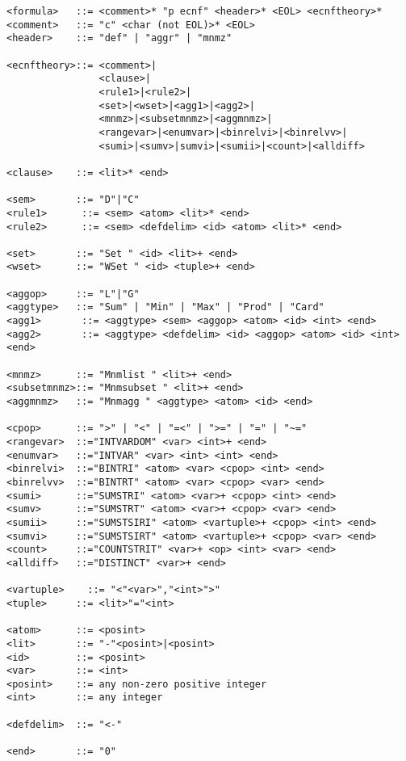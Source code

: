 \documentclass{article}
\begin{document}
\begin{verbatim}
<formula>   ::= <comment>* "p ecnf" <header>* <EOL> <ecnftheory>*
<comment>   ::= "c" <char (not EOL)>* <EOL>
<header>    ::= "def" | "aggr" | "mnmz"

<ecnftheory>::= <comment>|
                <clause>|
                <rule1>|<rule2>|
                <set>|<wset>|<agg1>|<agg2>|
                <mnmz>|<subsetmnmz>|<aggmnmz>|
                <rangevar>|<enumvar>|<binrelvi>|<binrelvv>|
                <sumi>|<sumv>|sumvi>|<sumii>|<count>|<alldiff>

<clause>    ::= <lit>* <end>

<sem>       ::= "D"|"C"
<rule1>      ::= <sem> <atom> <lit>* <end>
<rule2>      ::= <sem> <defdelim> <id> <atom> <lit>* <end>

<set>       ::= "Set " <id> <lit>+ <end>
<wset>      ::= "WSet " <id> <tuple>+ <end>

<aggop>     ::= "L"|"G"
<aggtype>   ::= "Sum" | "Min" | "Max" | "Prod" | "Card"
<agg1>       ::= <aggtype> <sem> <aggop> <atom> <id> <int> <end>
<agg2>       ::= <aggtype> <defdelim> <id> <aggop> <atom> <id> <int> <end>

<mnmz>      ::= "Mnmlist " <lit>+ <end>
<subsetmnmz>::= "Mnmsubset " <lit>+ <end>
<aggmnmz>   ::= "Mnmagg " <aggtype> <atom> <id> <end>

<cpop>      ::= ">" | "<" | "=<" | ">=" | "=" | "~="
<rangevar>  ::="INTVARDOM" <var> <int>+ <end>
<enumvar>   ::="INTVAR" <var> <int> <int> <end>
<binrelvi>  ::="BINTRI"	<atom> <var> <cpop> <int> <end>
<binrelvv>  ::="BINTRT"	<atom> <var> <cpop> <var> <end>
<sumi>      ::="SUMSTRI" <atom> <var>+ <cpop> <int> <end>
<sumv>      ::="SUMSTRT" <atom> <var>+ <cpop> <var> <end>
<sumii>     ::="SUMSTSIRI" <atom> <vartuple>+ <cpop> <int> <end>
<sumvi>     ::="SUMSTSIRT" <atom> <vartuple>+ <cpop> <var> <end>
<count>     ::="COUNTSTRIT" <var>+ <op> <int> <var> <end>
<alldiff>   ::="DISTINCT" <var>+ <end>

<vartuple>    ::= "<"<var>","<int>">"
<tuple>     ::= <lit>"="<int>	

<atom>      ::= <posint>
<lit>       ::= "-"<posint>|<posint>
<id>        ::= <posint>
<var>       ::= <int>
<posint>    ::= any non-zero positive integer
<int>       ::= any integer

<defdelim>  ::= "<-"

<end>       ::= "0"
\end{verbatim}
\end{document}

